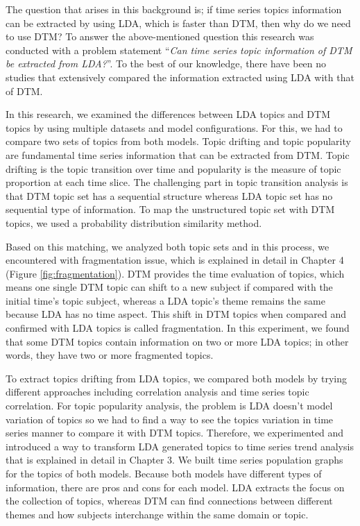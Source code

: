 \documentclass[a4paper]{report}
\begin{document}
The question that arises in this background is; if time series topics information can be extracted by using LDA, which is faster than DTM, then why do we need to use DTM?
To answer the above-mentioned question this research was conducted with a problem statement ``\emph{Can time series topic information of DTM be extracted from LDA?}''.
To the best of our knowledge, there have been no studies that extensively compared the information extracted using LDA with that of DTM.

In this research, we examined the differences between LDA topics and DTM topics by using multiple datasets and model configurations.
For this, we had to compare two sets of topics from both models. Topic drifting and topic popularity are fundamental time series information that can be extracted from DTM. Topic drifting is the topic transition over time and popularity is the measure of topic proportion at each time slice. The challenging part in topic transition analysis is that DTM topic set has a sequential structure whereas LDA topic set has no sequential type of information. To map the unstructured topic set with DTM topics, we used a probability distribution similarity method.

Based on this matching, we analyzed both topic sets and in this process, we encountered with fragmentation issue, which is explained in detail in Chapter 4 (Figure \ref{fig:fragmentation}).
DTM provides the time evaluation of topics, which means one single DTM topic can shift to a new subject if compared with the initial time's topic subject, whereas a LDA topic's theme remains the same because LDA has no time aspect. This shift in DTM topics when compared and confirmed with LDA topics is called fragmentation. In this experiment, we found that some DTM topics contain information on two or more LDA topics; in other words, they have two or more fragmented topics.

To extract topics drifting from LDA topics, we compared both models by trying different approaches including correlation analysis and time series topic correlation. For topic popularity analysis, the problem is LDA doesn't model variation of topics so we had to find a way to see the topics variation in time series manner to compare it with DTM topics. Therefore, we experimented and introduced a way to transform LDA generated topics to time series trend analysis that is explained in detail in Chapter 3. We built time series population graphs for the topics of both models. Because both models have different types of information, there are pros and cons for each model. LDA extracts the focus on the collection of topics, whereas DTM can find connections between different themes and how subjects interchange within the same domain or topic.
\end{document}
